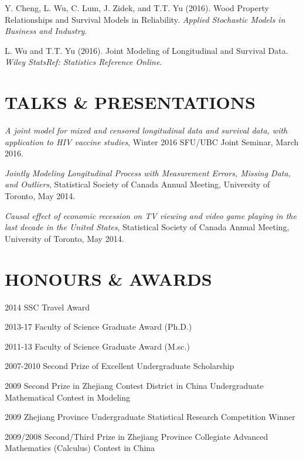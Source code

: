 \documentclass[margin]{res}
\begin{document}
\begin{resume}
Y. Cheng, L. Wu, C. Lum, J. Zidek, and T.T. Yu (2016).  Wood Property Relationships and Survival Models in Reliability. {\em Applied Stochastic Models in Business and Industry}.

L. Wu and T.T. Yu (2016).  Joint Modeling of Longitudinal and Survival Data. {\em Wiley StatsRef: Statistics Reference Online}.


\section{TALKS \&  PRESENTATIONS}  

{\it A joint model for mixed and censored longitudinal data and survival data, with application to HIV vaccine studies}, 
Winter 2016 SFU/UBC Joint Seminar, March 2016.

{\it Jointly Modeling Longitudinal Process with Measurement Errors, Missing Data, and Outliers},
Statistical Society of Canada Annual Meeting, University of Toronto, May 2014.

{\it Causal effect of economic recession on TV viewing and video game playing in the last decade in the United States}, Statistical Society of Canada Annual Meeting, University of Toronto, May 2014.



\section{HONOURS \&  AWARDS}
 2014 SSC Travel Award

 2013-17 Faculty of Science Graduate Award (Ph.D.)

 2011-13 Faculty of Science Graduate Award (M.sc.)

 2007-2010 Second Prize of Excellent Undergraduate Scholarship 

 2009 Second Prize in Zhejiang Contest District in China Undergraduate Mathematical Contest in Modeling

 2009 Zhejiang Province Undergraduate Statistical Research Competition Winner

  2009/2008 Second/Third Prize in Zhejiang Province Collegiate Advanced Mathematics (Calculus)
Contest in China


\end{resume}
\end{document}

